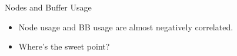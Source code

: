\documentclass[aspectratio=1610]{beamer}
\begin{document}
\begin{frame}{Nodes and Buffer Usage}
    \begin{figure} \centering
    \label{fig}
    \end{figure}
    \begin{itemize}
        \item  Node usage and BB usage are almost negatively correlated.
        \item Where's the sweet point?
    \end{itemize}
\end{frame}
\end{document}
